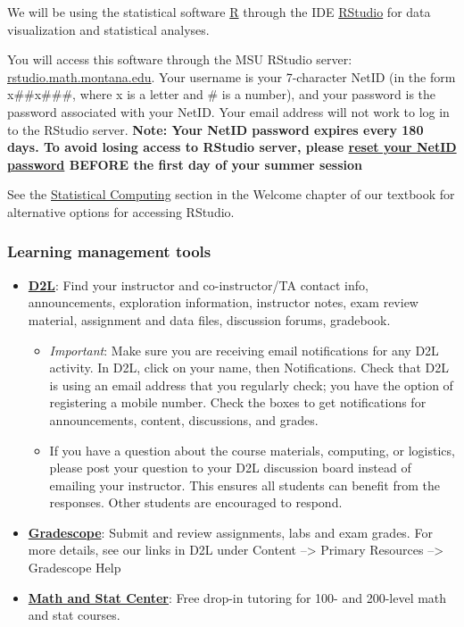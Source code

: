 \documentclass[
]{article}
\providecommand{\tightlist}{%
  \setlength{\itemsep}{0pt}\setlength{\parskip}{0pt}}
\begin{document}
We will be using the statistical software
\href{https://www.r-project.org/}{R} through the IDE
\href{https://rstudio.com/products/rstudio/}{RStudio} for data
visualization and statistical analyses.

You will access this software through the MSU RStudio server:
\href{https://rstudio.math.montana.edu/}{rstudio.math.montana.edu}. Your
username is your 7-character NetID (in the form x\#\#x\#\#\#, where x is
a letter and \# is a number), and your password is the password
associated with your NetID. Your email address will not work to log in
to the RStudio server. \textbf{Note: Your NetID password expires every
180 days. To avoid losing access to RStudio server, please
\href{https://pwreset.montana.edu/react/}{reset your NetID password}
BEFORE the first day of your summer session}

See the
\href{https://mtstateintrostats.github.io/IntroStatTextbook/\#stat-computing}{Statistical
Computing} section in the Welcome chapter of our textbook for
alternative options for accessing RStudio.

\subsubsection{Learning management
tools}\label{learning-management-tools}

\begin{itemize}
\item
  \href{https://ecat1.montana.edu/}{\textbf{D2L}}: Find your instructor
  and co-instructor/TA contact info, announcements, exploration
  information, instructor notes, exam review material, assignment and
  data files, discussion forums, gradebook.

  \begin{itemize}
  \tightlist
  \item
    \emph{Important}: Make sure you are receiving email notifications
    for any D2L activity. In D2L, click on your name, then
    Notifications. Check that D2L is using an email address that you
    regularly check; you have the option of registering a mobile number.
    Check the boxes to get notifications for announcements, content,
    discussions, and grades.
  \item
    If you have a question about the course materials, computing, or
    logistics, please post your question to your D2L discussion board
    instead of emailing your instructor. This ensures all students can
    benefit from the responses. Other students are encouraged to
    respond.
  \end{itemize}
\item
  \href{https://www.gradescope.com/}{\textbf{Gradescope}}: Submit and
  review assignments, labs and exam grades. For more details, see our
  links in D2L under Content --\textgreater{} Primary Resources
  --\textgreater{} Gradescope Help
\item
  \href{https://math.montana.edu/undergrad/msc/}{\textbf{Math and Stat
  Center}}: Free drop-in tutoring for 100- and 200-level math and stat
  courses.
\end{itemize}
\end{document}
